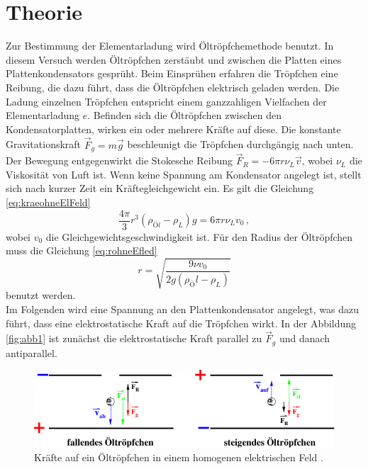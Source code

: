 \section{Theorie}
\label{sec:Theorie}

Zur Bestimmung der Elementarladung wird Öltröpfchemethode benutzt. In diesem Versuch werden Öltröpfchen zerstäubt und zwischen die Platten eines Plattenkondensators gesprüht.
Beim Einsprühen erfahren die Tröpfchen eine Reibung, die dazu führt, dass die Öltröpfchen elektrisch geladen werden.
Die Ladung einzelnen Tröpfchen entspricht einem ganzzahligen Vielfachen der Elementarladung $e$.
Befinden sich die Öltröpfchen zwischen den Kondensatorplatten, wirken ein oder mehrere Kräfte auf diese. 
Die konstante Gravitationskraft $\vec{F}_g = m \vec{g}$ beschleunigt die Tröpfchen durchgängig nach unten.
Der Bewegung entgegenwirkt die Stokesche Reibung $\vec{F}_R = -6 \pi r \nu_L \vec{v}$, wobei $\nu_L$ die Viskosität von Luft ist.
Wenn keine Spannung am Kondensator angelegt ist, stellt sich nach kurzer Zeit ein Kräftegleichgewicht ein.
Es gilt die Gleichung \eqref{eq:kraeohneElFeld}
\begin{equation}
    \frac{4 \pi}{3} r^3(\rho_{Öl} - \rho_L)g = 6 \pi r \nu_L v_0 \, ,
    \label{eq:kraeohneElFeld}
\end{equation}
wobei $v_0$ die Gleichgewichtsgeschwindigkeit ist. Für den Radius der Öltröpfchen muss die Gleichung \eqref{eq:rohneEfled}
\begin{equation}
    r = \sqrt{\frac{9 \nu v_0}{2 g (\rho_Öl - \rho_L)}}
    \label{eq:rohneEfled}
\end{equation}
benutzt werden.\\

Im Folgenden wird eine Spannung an den Plattenkondensator angelegt, was dazu führt, dass eine elektrostatische Kraft auf die Tröpfchen wirkt.
In der Abbildung \autoref{fig:abb1} ist zunächst die elektrostatische Kraft parallel zu $\vec{F}_g$ und danach antiparallel.


\begin{figure}[H]
    \centering
    \includegraphics{figures/Abb1.pdf}
    \caption{Kräfte auf ein Öltröpfchen in einem homogenen elektrischen Feld \cite{ap12}.}
    \label{fig:abb1}
\end{figure}


